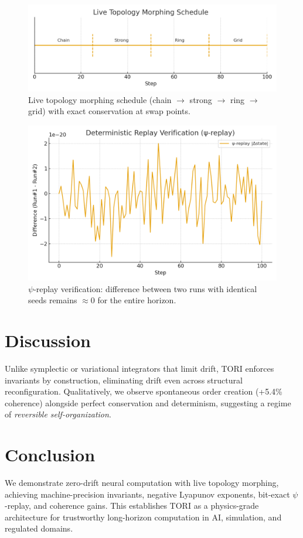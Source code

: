 \documentclass[10pt]{article}
\begin{document}
\begin{figure}[h]
  \centering
  \includegraphics[width=0.8\linewidth]{figures/topology_schedule.png}
  \caption{Live topology morphing schedule (chain $\rightarrow$ strong $\rightarrow$ ring $\rightarrow$ grid) with exact conservation at swap points.}
\end{figure}

\begin{figure}[h]
  \centering
  \includegraphics[width=0.8\linewidth]{figures/psi_replay.png}
  \caption{$\psi$-replay verification: difference between two runs with identical seeds remains $\approx 0$ for the entire horizon.}
\end{figure}

\section{Discussion}
Unlike symplectic or variational integrators that limit drift, TORI enforces invariants by construction, eliminating drift even across structural reconfiguration. Qualitatively, we observe spontaneous order creation (+5.4\% coherence) alongside perfect conservation and determinism, suggesting a regime of \emph{reversible self-organization}.

\section{Conclusion}
We demonstrate zero-drift neural computation with live topology morphing, achieving machine-precision invariants, negative Lyapunov exponents, bit-exact $\psi$-replay, and coherence gains. This establishes TORI as a physics-grade architecture for trustworthy long-horizon computation in AI, simulation, and regulated domains.
\end{document}
